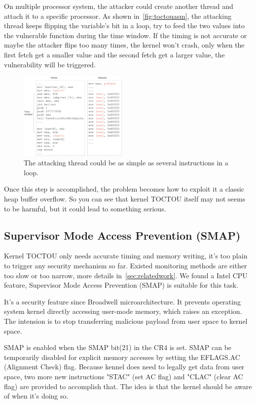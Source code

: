On multiple processor system, the attacker could create another thread and attach it to a specific processor. As shown in~\autoref{fig:toctouasm}, the attacking thread keeps flipping the variable's bit in a loop, try to feed the two values into the vulnerable function during the time window.
If the timing is not accurate or maybe the attacker flips too many times, the kernel won't crash, only when the first fetch get a smaller value and the second fetch get a larger value, the vulnerability will be triggered.

\begin{figure}[h]
  \includegraphics[width=0.47\textwidth]{figures/toctouasm}
  \centering
  \caption{The attacking thread could be as simple as several instructions in a loop.}
  \label{fig:toctouasm}
\end{figure}


Once this step is accomplished, the problem becomes how to exploit it a classic heap buffer overflow. So you can see that kernel TOCTOU itself may not seems to be harmful, but it could lead to something serious. 

\subsection{Supervisor Mode Access Prevention (SMAP)}
Kernel TOCTOU only needs accurate timing and memory writing, it's too plain to trigger any security mechanism so far. Existed monitoring methods are either too slow or too narrow, more details in~\autoref{sec:relatedwork}. We found a Intel CPU feature, Supervisor Mode Access Prevention (SMAP) is suitable for this task. 

It's a security feature since Broadwell microarchitecture. It prevents operating system kernel directly accessing user-mode memory, which raises an exception. The intension is to stop transferring malicious payload from user space to kernel space.

SMAP is enabled when the SMAP bit(21) in the CR4 is set. SMAP can be temporarily disabled for explicit memory accesses by setting the EFLAGS.AC (Alignment Check) flag. Because kennel does need to legally get data from user space, two more new instructions "STAC" (set AC flag) and "CLAC" (clear AC flag) are provided to accomplish that. The idea is that the kernel should be aware of when it's doing so. 

